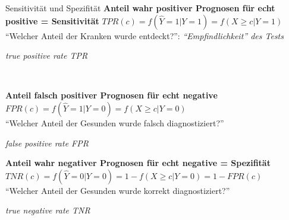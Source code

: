 \documentclass[
  10pt,
  ignorenonframetext,
]{beamer}
\begin{document}
\begin{frame}{Sensitivität und Spezifität}
\label{sensitivituxe4t-und-spezifituxe4t-2}
\textbf{Anteil wahr positiver Prognosen für echt positive =
Sensitivität} \(TPR(c) = f(\hat{Y}=1 | Y = 1) = f(X \geq c | Y=1)\)\\
``Welcher Anteil der Kranken wurde entdeckt?'':
\emph{``Empfindlichkeit'' des Tests}\\

\begin{footnotesize} \textit{true positive rate TPR} \end{footnotesize}

~ ~

\textbf{Anteil falsch positiver Prognosen für echt negative}\\
\(FPR(c) = f(\hat{Y}=1 | Y=0) = f(X \geq c | Y=0)\)\\
``Welcher Anteil der Gesunden wurde falsch diagnostiziert?''\\

\begin{footnotesize} \textit{false positive rate FPR} \end{footnotesize}

\textbf{Anteil wahr negativer Prognosen für echt negative = Spezifität}
\(TNR(c) = f(\hat{Y}=0 | Y=0) = 1 - f(X \geq c | Y=0) = 1 - FPR(c)\)\\
``Welcher Anteil der Gesunden wurde korrekt diagnostiziert?''\\

\begin{footnotesize} \textit{true negative rate TNR} \end{footnotesize}

~
\end{frame}
\end{document}
